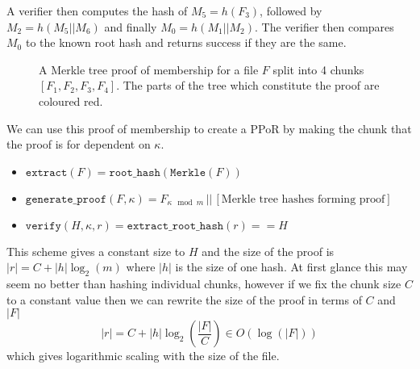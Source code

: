 \documentclass[12pt,a4paper,twoside,openright]{report}
\begin{document}
A verifier then computes the hash of $M_5 = h(F_3)$, followed by $M_2 = h(M_5 || M_6)$
and finally $M_0 = h(M_1 || M_2)$. The verifier then compares $M_0$ to the known root hash and returns success if they are the same.

\begin{figure}[h]
\centering
{}

\caption[A Merkle Tree proof of membership]{A Merkle tree proof of membership for
a file $F$ split into 4 chunks $[F_1, F_2, F_3, F_4]$.
The parts of the tree which constitute the proof are coloured red.}

\label{Merkle proof}
\end{figure}


We can use this proof of membership to create a PPoR by making the chunk that the proof is for dependent on $\kappa$.
\begin{itemize}
\item $\texttt{extract}(F) = \texttt{root\_hash}(\texttt{Merkle}(F))$

\item $\texttt{generate\_proof}(F, \kappa) =
F_{\kappa \mod m} \,||\, [\text{Merkle tree hashes forming proof}]$

\item $\texttt{verify}({H}, \kappa, r) =
\texttt{extract\_root\_hash}(r) == {H}$
\end{itemize}



This scheme gives a constant size to ${H}$ and the size of the proof is $|r| = C + |h| \log_2(m)$ where $|h|$ is the size of one hash.
At first glance this may seem no better than hashing individual chunks, however if we fix the chunk size $C$ to a constant value then we can rewrite
the size of the proof in terms of $C$ and $|F|$ \[\displaystyle |r| = C + |h| \log_2\left(\frac{|F|}{C}\right) \in O(\log(|F|))\]
which gives logarithmic scaling with the size of the file.
\end{document}
